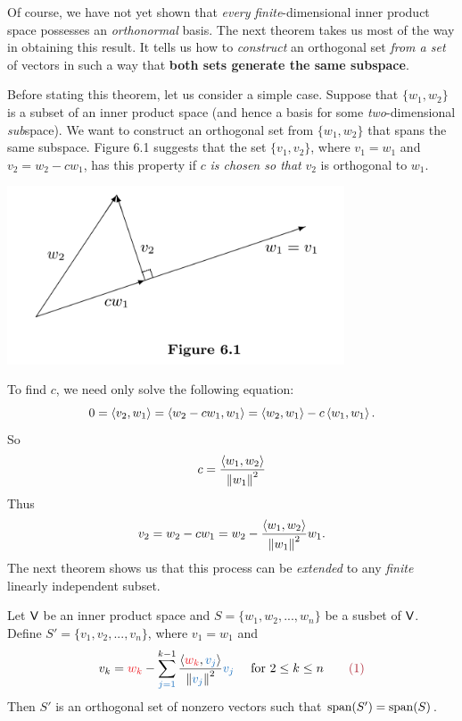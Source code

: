 \begin{remark} \label{remark 6.2.2}
Of course, we have not yet shown that \emph{every} \emph{finite}-dimensional inner product space possesses an \emph{orthonormal} basis.
The next theorem takes us most of the way in obtaining this result.
It tells us how to \emph{construct} an orthogonal set \emph{from a \LID{} set} of vectors in such a way that \textbf{both sets generate the same subspace}.

Before stating this theorem, let us consider a simple case.
Suppose that \(\{ w_1, w_2 \}\) is a \LID{} subset of an inner product space (and hence a basis for some \emph{two}-dimensional \emph{sub}space).
We want to construct an orthogonal set from \(\{ w_1, w_2 \}\) that spans the same subspace.
Figure 6.1 suggests that the set \(\{ v_1, v_2 \}\), where \(v_1 = w_1\) and \(v_2 = w_2 - cw_1\), has this property if \(c\) \emph{is chosen so that} \(v_2\) is orthogonal to \(w_1\).

\includegraphics[width=10cm]{images/figure-6-1.png}

To find \(c\), we need only solve the following equation:
\[
    0 = \left< v_2, w_1 \right> = \left< w_2 - cw_1, w_1 \right> = \left< w_2, w_1 \right> - c \left< w_1, w_1 \right>.
\]
So
\[
    c = \frac{\left< w_1, w_2 \right>}{ \left\lVert w_1\right\rVert^2 }
\]
Thus
\[
    v_2 = w_2 - c w_1 = w_2 - \frac{\left< w_1, w_2 \right>}{ \left\lVert w_1\right\rVert^2 } w_1.
\]
The next theorem shows us that this process can be \emph{extended} to any \emph{finite} linearly independent subset.
\end{remark}

\begin{theorem}  \label{thm 6.4}
Let \(\textsf{V}\) be an inner product space and \(S = \{ w_1, w_2, ..., w_n \}\) be a \LID{} susbet of \(\textsf{V}\).
Define \(S' = \{ v_1, v_2, ..., v_n \}\), where \(v_1 = w_1\) and
\[
    v_k = \RED{w_k} - \sum_{\BLUE{j = 1}}^{k - 1} \frac{\LG \RED{w_k}, \BLUE{v_j} \RG}{\norm{\BLUE{v_j}}^2} \BLUE{v_j} \quad \text{ for } 2 \le k \le n \quad \quad \MAROON{(1)}
\]
Then \(S'\) is an orthogonal set of nonzero vectors such that \(\operatorname{span}(S') = \operatorname{span}(S)\).
\end{theorem}

